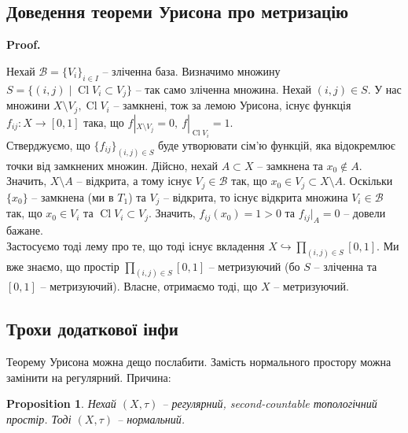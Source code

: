 \documentclass[a4paper, 10pt]{article}
\makeatletter
\theoremstyle{theoremdd}
\newtheorem{proposition}[theorem]{Proposition}
\DeclareMathOperator{\Cl}{Cl}
\renewenvironment{proof}[1][Proof.\\]{\par
\pushQED{\hfill \qed}%
\normalfont \topsep6\p@\@plus6\p@\relax
\trivlist
\item\relax
{\bfseries
#1\@addpunct{.}}\hspace\labelsep\ignorespaces
}{%
\popQED\endtrivlist\@endpefalse
}
\makeatother
\begin{document}
\subsection{Доведення теореми Урисона про метризацію}
\begin{proof}
Нехай $\mathcal{B} = \{V_i\}_{i \in I}$ -- зліченна база. Визначимо множину $S = \{ (i,j) \mid \Cl V_i \subset V_j \}$ -- так само зліченна множина. Нехай $(i,j) \in S$. У нас множини $X \setminus V_j, \Cl V_i$ -- замкнені, тож за лемою Урисона, існує функція $f_{ij} \colon X \to [0,1]$ така, що $f|_{X \setminus V_j} = 0,\ f|_{\Cl V_i} = 1$.\\
Стверджуємо, що $\{f_{ij}\}_{(i,j) \in S}$ буде утворювати сім'ю функцій, яка відокремлює точки від замкнених множин. Дійсно, нехай $A \subset X$ -- замкнена та $x_0 \notin A$. Значить, $X \setminus A$ -- відкрита, а тому існує $V_j \in \mathcal{B}$ так, що $x_0 \in V_j \subset X \setminus A$. Оскільки $\{x_0\}$ -- замкнена (ми в $T_1$) та $V_j$ -- відкрита, то існує відкрита множина $V_i \in \mathcal{B}$ так, що $x_0 \in V_i$ та $\Cl V_i \subset V_j$. Значить, $f_{ij}(x_0) = 1 > 0$ та $f_{ij}|_A= 0$ -- довели бажане.\\
Застосуємо тоді лему про те, що тоді існує вкладення $X \hookrightarrow \displaystyle\prod_{(i,j) \in S} [0,1]$. Ми вже знаємо, що простір $\displaystyle\prod_{(i,j) \in S} [0,1]$ -- метризуючий (бо $S$ -- зліченна та $[0,1]$ -- метризуючий). Власне, отримаємо тоді, що $X$ -- метризуючий.
\end{proof}

\subsection{Трохи додаткової інфи}
Теорему Урисона можна дещо послабити. Замість нормального простору можна замінити на регулярний. Причина:
\begin{proposition}
Нехай $(X,\tau)$ -- регулярний, second-countable топологічний простір. Тоді $(X,\tau)$ -- нормальний.
\end{proposition}
\end{document}
